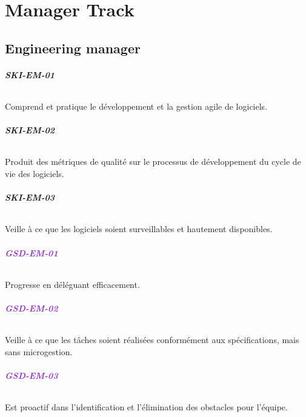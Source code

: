 \documentclass[a4paper, french, openany, 12pt]{book}
\newcommand\dex[1]{\textcolor{BrickRed}{\textbf{\uppercase{ski-{#1}}}}}
\newcommand\str[1]{\textcolor{DarkOrchid}{\textbf{\uppercase{gsd-{#1}}}}}
\begin{document}
\part{Manager Track}

\chapter{Engineering manager}

\begin{multicols}{2}

  \paragraph*{\dex{em-01}}

  Comprend et pratique le développement et la gestion agile de logiciels.

  \paragraph*{\dex{em-02}}

  Produit des métriques de qualité sur le processus de développement du cycle de vie des logiciels.
  
  \paragraph*{\dex{em-03}}

  Veille à ce que les logiciels soient surveillables et hautement disponibles.

  \paragraph*{\str{em-01}}

  Progresse en déléguant efficacement.
  
  \paragraph*{\str{em-02}}

  Veille à ce que les tâches soient réalisées conformément aux spécifications, mais sans microgestion.

  \paragraph*{\str{em-03}}

  Est proactif dans l'identification et l'élimination des obstacles pour l'équipe.


\end{multicols}
\end{document}
